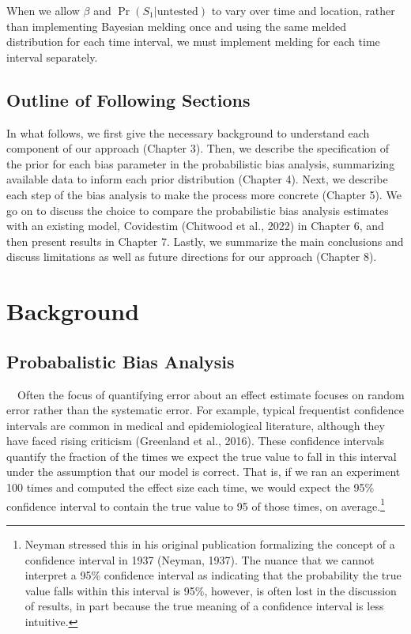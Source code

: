 \documentclass[12pt,twoside]{smiththesis}
\begin{document}
When we allow \(\beta\) and \(\Pr(S_1|\text{untested})\) to vary over time and location, rather than implementing Bayesian melding once and using the same melded distribution for each time interval, we must implement melding for each time interval separately.

\hypertarget{outline-of-following-sections}{%
\section{Outline of Following Sections}\label{outline-of-following-sections}}

In what follows, we first give the necessary background to understand each component of our approach (Chapter 3). Then, we describe the specification of the prior for each bias parameter in the probabilistic bias analysis, summarizing available data to inform each prior distribution (Chapter 4). Next, we describe each step of the bias analysis to make the process more concrete (Chapter 5). We go on to discuss the choice to compare the probabilistic bias analysis estimates with an existing model, Covidestim (Chitwood et al., 2022) in Chapter 6, and then present results in Chapter 7. Lastly, we summarize the main conclusions and discuss limitations as well as future directions for our approach (Chapter 8).

\hypertarget{background}{%
\chapter{Background}\label{background}}

\hypertarget{probabalistic-bias-analysis}{%
\section{Probabalistic Bias Analysis}\label{probabalistic-bias-analysis}}

~~Often the focus of quantifying error about an effect estimate focuses on random error rather than the systematic error. For example, typical frequentist confidence intervals are common in medical and epidemiological literature, although they have faced rising criticism (Greenland et al., 2016). These confidence intervals quantify the fraction of the times we expect the true value to fall in this interval under the assumption that our model is correct. That is, if we ran an experiment 100 times and computed the effect size each time, we would expect the 95\% confidence interval to contain the true value to 95 of those times, on average.\footnote{Neyman stressed this in his original publication formalizing the concept of a confidence interval in 1937 (Neyman, 1937). The nuance that we cannot interpret a 95\% confidence interval as indicating that the probability the true value falls within this interval is 95\%, however, is often lost in the discussion of results, in part because the true meaning of a confidence interval is less intuitive.}
\end{document}
